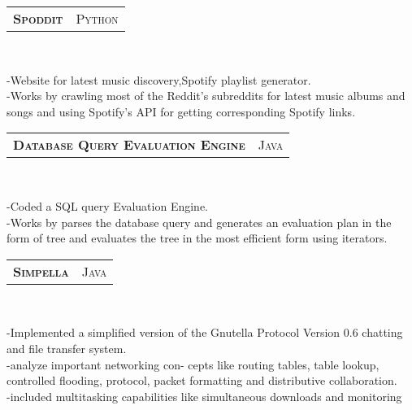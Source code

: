 \documentclass[10pt,a4paper,oneside]{article}
\begin{document}
\begin{minipage}[t]{0.63\textwidth}
        \begin{tabular}{c|c}
            \textbf{\normalsize S\textsc{poddit}}
            &\textmd{\normalsize P\textsc{ython}}
        \end{tabular}\\
         \vspace{-4mm}
        \begin{adjustwidth}{7pt}{0pt}
        {\footnotesize -Website for latest music
        discovery,Spotify playlist generator.\\
        -Works by crawling most of the Reddit's subreddits for
        latest music albums and songs and using Spotify's API for
        getting corresponding Spotify links.}\\
        \end{adjustwidth}
        \begin{tabular}{c|c}
            \textbf{\normalsize D\textsc{atabase} Q\textsc{uery}
            E\textsc{valuation} E\textsc{ngine}}
            &\textmd{\normalsize J\textsc{ava}}
        \end{tabular}\\
         \vspace{-4mm}
        \begin{adjustwidth}{7pt}{0pt}
        {\footnotesize -Coded a SQL query Evaluation Engine.\\
        -Works by parses the database query and generates an evaluation plan in the form of tree and evaluates the tree in the most efficient form using iterators.}\\
        \end{adjustwidth}
        \begin{tabular}{c|c}
            \textbf{\normalsize S\textsc{impella}}
            &\textmd{\normalsize J\textsc{ava}}
        \end{tabular}\\
         \vspace{-4mm}
        \begin{adjustwidth}{7pt}{0pt}
        {\footnotesize -Implemented a simplified version of the
        Gnutella Protocol Version 0.6 chatting and file transfer
        system.\\
        -analyze important networking con-
        cepts like routing tables, table lookup, controlled
        flooding, protocol, packet formatting and distributive
        collaboration.\\
        -included multitasking capabilities like simultaneous
        downloads and monitoring}\\

\end{adjustwidth}
\end{minipage}
\end{document}
